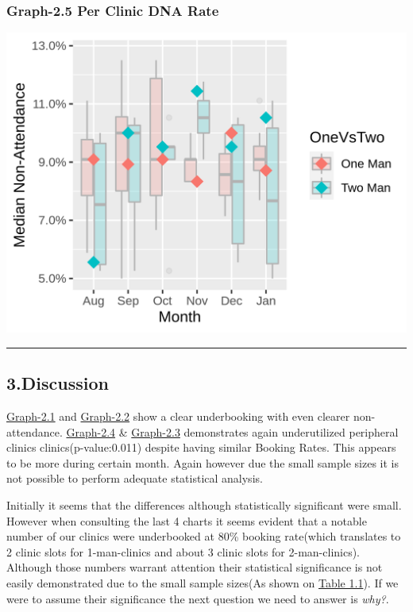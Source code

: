 \documentclass[]{article}
\begin{document}
\hypertarget{graph-2.5-per-clinic-dna-rate}{%
\subsubsection{Graph-2.5 Per Clinic DNA
Rate}\label{graph-2.5-per-clinic-dna-rate}}

\begin{center}\includegraphics{LF2_files/figure-latex/unnamed-chunk-10-1} \end{center}

\begin{center}\rule{0.5\linewidth}{0.5pt}\end{center}

\hypertarget{discussion}{%
\subsection{3.Discussion}\label{discussion}}

\protect\hyperlink{graph2.1}{Graph-2.1} and
\protect\hyperlink{graph2.2}{Graph-2.2} show a clear underbooking with
even clearer non-attendance. \protect\hyperlink{graph2.4}{Graph-2.4} \&
\protect\hyperlink{graph2.3}{Graph-2.3} demonstrates again underutilized
peripheral clinics clinics(p-value:0.011) despite having similar Booking
Rates. This appears to be more during certain month. Again however due
the small sample sizes it is not possible to perform adequate
statistical analysis.

Initially it seems that the differences although statistically
significant were small. However when consulting the last 4 charts it
seems evident that a notable number of our clinics were underbooked at
80\% booking rate(which translates to 2 clinic slots for 1-man-clinics
and about 3 clinic slots for 2-man-clinics). Although those numbers
warrant attention their statistical significance is not easily
demonstrated due to the small sample sizes(As shown on
\protect\hyperlink{table_1.1}{Table 1.1}). If we were to assume their
significance the next question we need to answer is \emph{why?}.
\end{document}

